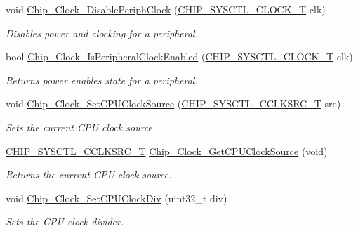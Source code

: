 \begin{DoxyCompactItemize}
void \hyperlink{group___c_l_o_c_k__17_x_x__40_x_x_ga1bcb3f29f3cfbe896517e7bb6ebeaf03}{Chip\+\_\+\+Clock\+\_\+\+Disable\+Periph\+Clock} (\hyperlink{group___c_l_o_c_k__17_x_x__40_x_x_ga82e75cbe777e79f448fec3987ddd978e}{C\+H\+I\+P\+\_\+\+S\+Y\+S\+C\+T\+L\+\_\+\+C\+L\+O\+C\+K\+\_\+\+T} clk)
\begin{DoxyCompactList}\small\item\em Disables power and clocking for a peripheral. \end{DoxyCompactList}\item 
bool \hyperlink{group___c_l_o_c_k__17_x_x__40_x_x_ga0d7f762be4d4293d10d379fcc0b2388b}{Chip\+\_\+\+Clock\+\_\+\+Is\+Peripheral\+Clock\+Enabled} (\hyperlink{group___c_l_o_c_k__17_x_x__40_x_x_ga82e75cbe777e79f448fec3987ddd978e}{C\+H\+I\+P\+\_\+\+S\+Y\+S\+C\+T\+L\+\_\+\+C\+L\+O\+C\+K\+\_\+\+T} clk)
\begin{DoxyCompactList}\small\item\em Returns power enables state for a peripheral. \end{DoxyCompactList}\item 
void \hyperlink{group___c_l_o_c_k__17_x_x__40_x_x_gaefeafe3f6ad6d2690c252e6cfcc826dd}{Chip\+\_\+\+Clock\+\_\+\+Set\+C\+P\+U\+Clock\+Source} (\hyperlink{group___c_l_o_c_k__17_x_x__40_x_x_ga983f42d70f3939d1f1b46673e9e1f838}{C\+H\+I\+P\+\_\+\+S\+Y\+S\+C\+T\+L\+\_\+\+C\+C\+L\+K\+S\+R\+C\+\_\+\+T} src)
\begin{DoxyCompactList}\small\item\em Sets the current C\+P\+U clock source. \end{DoxyCompactList}\item 
\hyperlink{group___c_l_o_c_k__17_x_x__40_x_x_ga983f42d70f3939d1f1b46673e9e1f838}{C\+H\+I\+P\+\_\+\+S\+Y\+S\+C\+T\+L\+\_\+\+C\+C\+L\+K\+S\+R\+C\+\_\+\+T} \hyperlink{group___c_l_o_c_k__17_x_x__40_x_x_ga84a5acda2829b05c81326606630b7238}{Chip\+\_\+\+Clock\+\_\+\+Get\+C\+P\+U\+Clock\+Source} (void)
\begin{DoxyCompactList}\small\item\em Returns the current C\+P\+U clock source. \end{DoxyCompactList}\item 
void \hyperlink{group___c_l_o_c_k__17_x_x__40_x_x_gaf88a9722800b98c3ea3cccb572c54230}{Chip\+\_\+\+Clock\+\_\+\+Set\+C\+P\+U\+Clock\+Div} (uint32\+\_\+t div)
\begin{DoxyCompactList}\small\item\em Sets the C\+P\+U clock divider. \end{DoxyCompactList}\item 

\end{DoxyCompactItemize}
